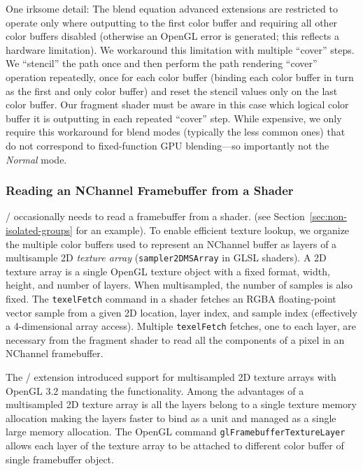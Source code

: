 One irksome detail:  The blend equation advanced extensions are restricted to operate only where outputting to the
first color buffer and requiring all other color buffers disabled (otherwise an OpenGL error is generated; this
reflects a hardware limitation).  We workaround this limitation with multiple ``cover'' steps.
We ``stencil'' the path once and then perform the path rendering ``cover''
operation repeatedly, once for each color buffer
(binding each color buffer in turn as the first and only color buffer)
and reset the stencil values only on the last color buffer.
Our fragment shader must be aware in this case which logical color buffer it is outputting in each repeated ``cover'' step.
While expensive, we only require this workaround for blend modes (typically the less common
ones) that do not correspond to fixed-function GPU blending---so importantly not the {\em Normal} mode.

\subsubsection{Reading an NChannel Framebuffer from a Shader}

\Illustrator/ occasionally needs to read a framebuffer from a shader.
(see Section~\ref{sec:non-isolated-groups} for an example).
To enable efficient texture lookup, we
organize the multiple color buffers
used to represent an NChannel
buffer
as layers
of a multisample 2D {\em texture array} ({\tt sampler2DMSArray} in GLSL
shaders).  A 2D texture array
is a single OpenGL texture object with a fixed format, width, height, and number of layers. 
When
multisampled, the number of samples is also fixed.
The {\tt texelFetch} command in a shader fetches an RGBA
floating-point vector sample from a given 2D location, layer index, and sample index (effectively a 4-dimensional array access).
Multiple {\tt texel\-Fetch} fetches, one to each layer, are necessary
from the fragment shader to read all the components of a pixel in an
NChannel framebuffer.

The \ARBtms/ extension \cite{TextureMultisample} introduced support for
multisampled 2D texture arrays with OpenGL 3.2 mandating the functionality.
Among the advantages of a multisampled 2D texture array is all the layers belong to a single texture memory allocation
making the layers faster to bind as a unit and managed as a single large memory allocation.
The OpenGL command {\tt glFramebuffer\-Texture\-Layer} allows
each layer of the texture array to be attached to different color buffer
of single framebuffer object.
